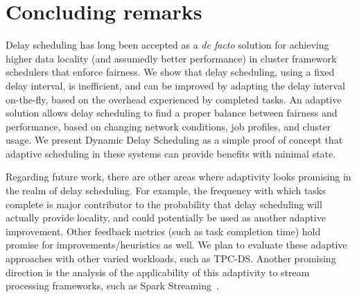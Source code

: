\clearpage

\section{Concluding remarks}\label{sec:conclusion}

Delay scheduling has long been accepted as a \textit{de facto} solution for achieving
higher data locality (and assumedly better performance) in cluster framework schedulers that
enforce fairness. We show that 
delay scheduling, using a fixed delay interval, is inefficient, and can be improved by 
adapting the delay interval on-the-fly, based on the overhead experienced by completed tasks. 
An adaptive solution allows delay scheduling to find a proper balance between fairness and
performance, based on changing network conditions, job profiles, and cluster usage.
We present Dynamic Delay Scheduling as a simple proof of concept that adaptive scheduling
in these systems can provide benefits with minimal state.

Regarding future work, there are other areas where adaptivity looks promising in the realm of
delay scheduling. For example, the frequency with which tasks complete is major contributor
to the probability that delay scheduling will actually provide locality, and could potentially
be used as another adaptive improvement. Other feedback metrics (such as task completion time) 
hold promise for improvements/heuristics as well. We plan to evaluate these adaptive approaches
with other varied workloads, such as TPC-DS. Another promising direction is the analysis of the applicability
of this adaptivity to stream processing frameworks, such as Spark Streaming~\cite{Zaharia:2013str}.
